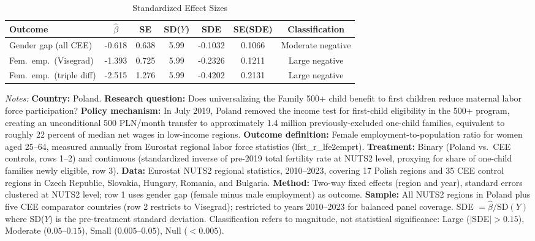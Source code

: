 \begin{table}[htbp]
\centering
\caption{Standardized Effect Sizes}
\label{tab:sde}
\small
\begin{tabular}{lcccccc}
\toprule
Outcome & $\hat{\beta}$ & SE & SD($Y$) & SDE & SE(SDE) & Classification \\
\midrule
Gender gap (all CEE) & -0.618 & 0.638 & 5.99 & -0.1032 & 0.1066 & Moderate negative \\
Fem.\ emp.\ (Visegrad) & -1.393 & 0.725 & 5.99 & -0.2326 & 0.1211 & Large negative \\
Fem.\ emp.\ (triple diff) & -2.515 & 1.276 & 5.99 & -0.4202 & 0.2131 & Large negative \\
\bottomrule
\end{tabular}
\begin{tablenotes}[flushleft]
\small
\item \textit{Notes:} \textbf{Country:} Poland. \textbf{Research question:} Does universalizing the Family 500+ child benefit to first children reduce maternal labor force participation? \textbf{Policy mechanism:} In July 2019, Poland removed the income test for first-child eligibility in the 500+ program, creating an unconditional 500 PLN/month transfer to approximately 1.4 million previously-excluded one-child families, equivalent to roughly 22 percent of median net wages in low-income regions. \textbf{Outcome definition:} Female employment-to-population ratio for women aged 25--64, measured annually from Eurostat regional labor force statistics (lfst\_r\_lfe2emprt). \textbf{Treatment:} Binary (Poland vs.\ CEE controls, rows 1--2) and continuous (standardized inverse of pre-2019 total fertility rate at NUTS2 level, proxying for share of one-child families newly eligible, row 3). \textbf{Data:} Eurostat NUTS2 regional statistics, 2010--2023, covering 17 Polish regions and 35 CEE control regions in Czech Republic, Slovakia, Hungary, Romania, and Bulgaria. \textbf{Method:} Two-way fixed effects (region and year), standard errors clustered at NUTS2 level; row 1 uses gender gap (female minus male employment) as outcome. \textbf{Sample:} All NUTS2 regions in Poland plus five CEE comparator countries (row 2 restricts to Visegrad); restricted to years 2010--2023 for balanced panel coverage. SDE $= \hat{\beta} / \text{SD}(Y)$ where SD($Y$) is the pre-treatment standard deviation. Classification refers to magnitude, not statistical significance: Large ($|$SDE$| > 0.15$), Moderate ($0.05$--$0.15$), Small ($0.005$--$0.05$), Null ($< 0.005$).
\end{tablenotes}
\end{table}
